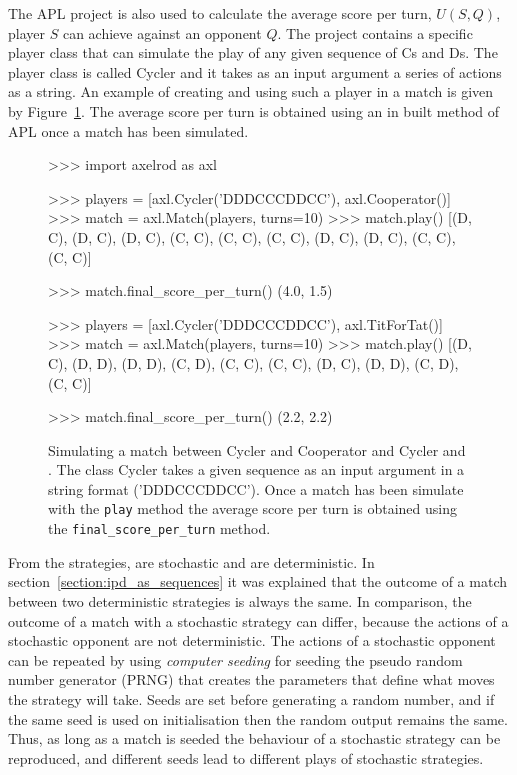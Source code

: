 The APL project is also used to calculate the average score per turn, \(U(S, Q)\),
player \(S\) can achieve against an opponent \(Q\). The project contains a specific
player
class that can simulate the play of any given sequence of Cs and Ds. The player class
is called Cycler and it takes as an input argument a series of actions as a
string.
An example of creating and using such a player in a match is given by
Figure~\ref{fig:apl_simulations_cycler}. The average score per turn is obtained
using an in built method of APL once a match has been simulated.

\begin{figure}[!htbp]
    \begin{usagepy}
>>> import axelrod as axl

>>> players = [axl.Cycler('DDDCCCDDCC'), axl.Cooperator()]
>>> match = axl.Match(players, turns=10)
>>> match.play()
[(D, C), (D, C), (D, C), (C, C), (C, C), (C, C), (D, C), (D, C), (C, C), (C, C)]

>>> match.final_score_per_turn()
(4.0, 1.5)

>>> players = [axl.Cycler('DDDCCCDDCC'), axl.TitForTat()]
>>> match = axl.Match(players, turns=10)
>>> match.play()
[(D, C), (D, D), (D, D), (C, D), (C, C), (C, C), (D, C), (D, D), (C, D), (C, C)]

>>> match.final_score_per_turn()
(2.2, 2.2)

\end{usagepy}
\caption{Simulating a match between Cycler and Cooperator and Cycler and \TitForTat.
The class Cycler takes a given sequence as an input argument in a string format
('DDDCCCDDCC'). Once a match has been simulate with the \texttt{play} method
the average score per turn is obtained using the \texttt{final_score_per_turn}
method.}\label{fig:apl_simulations_cycler}
\end{figure}

From the \numberofstrategiesbestsequences strategies, \stochasticstrategies are stochastic and
\deterministicstrategies are deterministic. In section~\ref{section:ipd_as_sequences} it was explained
that the outcome of a match between two deterministic strategies is always the same.
In comparison, the outcome of a match with a stochastic strategy can
differ, because the actions of a stochastic opponent are not deterministic.
The actions of a stochastic opponent can be repeated by using
\textit{computer seeding} for seeding the pseudo random number generator (PRNG) that creates the
parameters that define what moves the strategy will take. Seeds are set before
generating a random number, and if the same seed is used on initialisation then
the random output remains the same. Thus, as long as a match is seeded the
behaviour of a stochastic strategy can be reproduced, and different seeds lead
to different plays of stochastic strategies.

